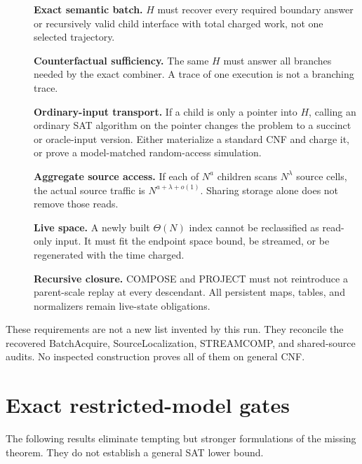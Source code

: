 \documentclass[11pt]{article}
\begin{document}
\begin{description}
\item[] \textbf{Exact semantic batch.}  $H$ must recover every required
boundary answer or recursively valid child interface with total charged work,
not one selected trajectory.
\item[] \textbf{Counterfactual sufficiency.}  The same $H$ must answer all
branches needed by the exact combiner.  A trace of one execution is not a
branching trace.
\item[] \textbf{Ordinary-input transport.}  If a child is only a pointer into
$H$, calling an ordinary SAT algorithm on the pointer changes the problem to a
succinct or oracle-input version.  Either materialize a standard CNF and charge
it, or prove a model-matched random-access simulation.
\item[] \textbf{Aggregate source access.}  If each of $N^a$ children scans
$N^\lambda$ source cells, the actual source traffic is $N^{a+\lambda+o(1)}$.
Sharing storage alone does not remove those reads.
\item[] \textbf{Live space.}  A newly built $\Theta(N)$ index cannot be
reclassified as read-only input.  It must fit the endpoint space bound, be
streamed, or be regenerated with the time charged.
\item[] \textbf{Recursive closure.}  COMPOSE and PROJECT must not reintroduce
a parent-scale replay at every descendant.  All persistent maps, tables, and
normalizers remain live-state obligations.
\end{description}

These requirements are not a new list invented by this run.  They reconcile
the recovered BatchAcquire, SourceLocalization, STREAMCOMP, and shared-source
audits.  No inspected construction proves all of them on general CNF.

\section{Exact restricted-model gates}
The following results eliminate tempting but stronger formulations of the
missing theorem.  They do not establish a general SAT lower bound.
\end{document}
